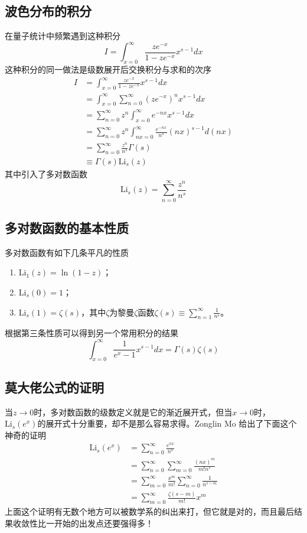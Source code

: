 \documentclass[a4paper,11pt]{ctexart}
\newcommand{\beq}{\begin{equation}}
\newcommand{\eeq}{\end{equation}}
\newcommand{\bea}{\begin{equation}\begin{aligned}}
\newcommand{\eea}{\end{aligned}\end{equation}}
\newcommand{\Li}[1]{\mathrm{Li}_{#1}}
\begin{document}
\subsection{波色分布的积分}
在量子统计中频繁遇到这种积分
\beq
I = \int_{x=0}^\infty \frac{ze^{-x}}{1 - ze^{-x}} x^{s-1} dx
\eeq
这种积分的同一做法是级数展开后交换积分与求和的次序
\bea
I &= \int_{x=0}^\infty \frac{ze^{-x}}{1 - ze^{-x}} x^{s-1} dx \\
&= \int_{x=0}^\infty \sum_{n=0}^\infty \left( ze^{-x}\right)^n x^{s-1} dx\\
&= \sum_{n=0}^\infty z^n \int_{x=0}^\infty  e^{-nx} x^{s-1} dx\\
&= \sum_{n=0}^\infty z^n \int_{nx=0}^\infty  \frac{e^{-nx}}{n^s} (nx)^{s-1} d(nx)\\
&= \sum_{n=0}^\infty \frac{z^n}{n^s} \Gamma(s) \\
&\equiv \Gamma(s) \Li{s}(z)
\eea
其中引入了多对数函数
\beq
\Li{s}(z) = \sum_{n=0}^\infty \frac{z^n}{n^s}
\eeq
\subsection{多对数函数的基本性质}
多对数函数有如下几条平凡的性质
\begin{enumerate}
\item $\Li{1}(z) = \ln (1 - z)$；
\item $\Li{s}(0) = 1$；
\item $\Li{s}(1) = \zeta(s)$，其中$\zeta$为黎曼$\zeta$函数$\zeta(s) \equiv \sum_{n=1}^\infty \frac{1}{n^s}$。
\end{enumerate}
根据第三条性质可以得到另一个常用积分的结果
\beq
\int_{x=0}^\infty \frac{1}{e^{x} - 1} x^{s-1} dx = \Gamma(s) \zeta(s)
\eeq

\subsection{莫大佬公式的证明}
当$z \to 0$时，多对数函数的级数定义就是它的渐近展开式，但当$x \to 0$时，$\Li{s}(e^x)$的展开式十分重要，却不是那么容易求得。Zonglin Mo 给出了下面这个神奇的证明
\bea
\Li{s}(e^x) &= \sum_{n=0}^\infty \frac{e^{nx}}{n^s}\\
&= \sum_{n=0}^\infty \sum_{m = 0}^\infty \frac{(nx)^m}{m! n^s} \\
&= \sum_{m=0}^\infty \frac{x^m}{m!} \sum_{n=0}^\infty \frac{1}{n^{s-m}} \\
&= \sum_{m=0}^\infty \frac{\zeta(s-m)}{m!} x^m
\eea
上面这个证明有无数个地方可以被数学系的纠出来打，但它就是对的，而且最后结果收敛性比一开始的出发点还要强得多！
\end{document}
